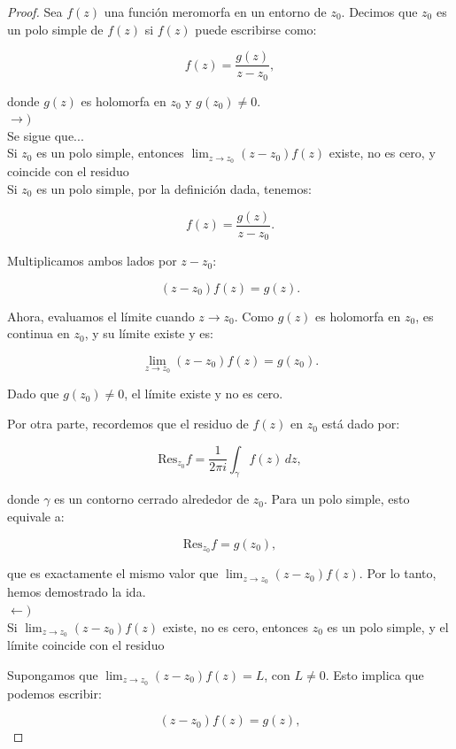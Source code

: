 \documentclass{article}
\begin{document}
\begin{proof}
Sea \(f(z)\) una función meromorfa en un entorno de \(z_0\). Decimos que \(z_0\) es un polo simple de \(f(z)\) si \(f(z)\) puede escribirse como:

\[
f(z) = \frac{g(z)}{z - z_0},
\]

\noindent donde \(g(z)\) es holomorfa en \(z_0\) y \(g(z_0) \neq 0\).\\

$\longrightarrow )$\\

Se sigue que...\\
Si \(z_0\) es un polo simple, entonces \(\lim_{z \to z_0} (z - z_0)f(z)\) existe, no es cero, y coincide con el residuo\\
Si \(z_0\) es un polo simple, por la definición dada, tenemos:

\[
f(z) = \frac{g(z)}{z - z_0}.
\]

Multiplicamos ambos lados por \(z - z_0\):

\[
(z - z_0)f(z) = g(z).
\]

Ahora, evaluamos el límite cuando \(z \to z_0\). Como \(g(z)\) es holomorfa en \(z_0\), es continua en \(z_0\), y su límite existe y es:

\[
\lim_{z \to z_0} (z - z_0)f(z) = g(z_0).
\]

Dado que \(g(z_0) \neq 0\), el límite existe y no es cero.

Por otra parte, recordemos que el residuo de \(f(z)\) en \(z_0\) está dado por:

\[
\text{Res}_{z_0}f = \frac{1}{2\pi i} \int_{\gamma} f(z) \, dz,
\]

donde \(\gamma\) es un contorno cerrado alrededor de \(z_0\). Para un polo simple, esto equivale a:

\[
\text{Res}_{z_0}f = g(z_0),
\]

que es exactamente el mismo valor que \(\lim_{z \to z_0} (z - z_0)f(z)\). Por lo tanto, hemos demostrado la ida.\\

$\longleftarrow )$ \\

Si \(\lim_{z \to z_0} (z - z_0)f(z)\) existe, no es cero, entonces \(z_0\) es un polo simple, y el límite coincide con el residuo

Supongamos que \(\lim_{z \to z_0} (z - z_0)f(z) = L\), con \(L \neq 0\). Esto implica que podemos escribir:

\[
(z - z_0)f(z) = g(z),
\]


\end{proof}
\end{document}
